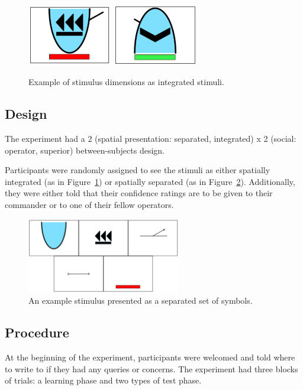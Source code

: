 \documentclass[doc, a4paper, apacite]{apa6}
\begin{document}
\begin{figure}[b]
	\centering
	\includegraphics[width=0.33\textwidth]{images/integratedStimulusExample}
	\includegraphics[width=0.33\textwidth]{images/integratedStimulusExample2}
	\caption{Example of stimulus dimensions as integrated stimuli.}
	\label{fig:integratedStimuli}
\end{figure}

\subsection{Design}
The experiment had a 2 (spatial presentation: separated, integrated) x 2 (social: operator, superior) between-subjects design. 

Participants were randomly assigned to see the stimuli as either spatially integrated (as in Figure~\ref{fig:integratedStimuli}) or spatially separated (as in Figure~\ref{fig:separatedStimulus}). 
Additionally, they were either told that their confidence ratings are to be given to their commander or to one of their fellow operators. 

\begin{figure}[t]
	\centering	
	\includegraphics[width=0.6\textwidth]{images/separatedStimulusExample}
	\caption{An example stimulus presented as a separated set of symbols.}
	\label{fig:separatedStimulus}	
\end{figure}

\subsection{Procedure}
At the beginning of the experiment, participants were welcomed and told where to write to if they had any queries or concerns. 
The experiment had three blocks of trials: a learning phase and two types of test phase. 
\end{document}
